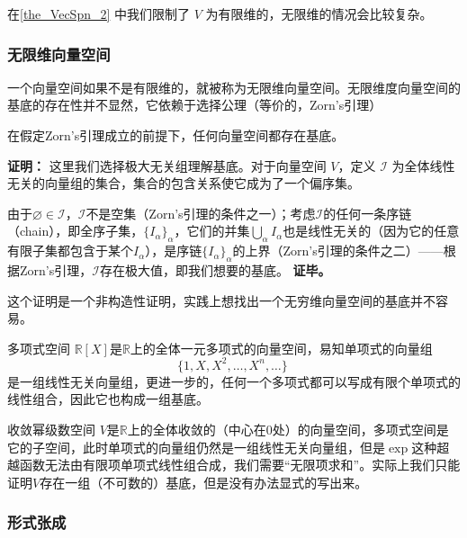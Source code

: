 在\autoref{the_VecSpn_2} 中我们限制了 $V$ 为有限维的，无限维的情况会比较复杂。

\subsubsection{无限维向量空间}

一个向量空间如果不是有限维的，就被称为无限维向量空间。无限维度向量空间的基底的存在性并不显然，它依赖于选择公理（等价的，Zorn's引理）

\begin{theorem}{}
在假定Zorn's引理成立的前提下，任何向量空间都存在基底。
\end{theorem}
\textbf{证明：}
这里我们选择极大无关组理解基底。对于向量空间 $V$，定义 $\mathcal{I}$ 为全体线性无关的向量组的集合，集合的包含关系使它成为了一个偏序集。


由于$\varnothing \in \mathcal{I}$，$\mathcal{I}$不是空集（Zorn's引理的条件之一）；考虑$\mathcal{I}$的任何一条序链（chain），即全序子集，$\{I_\alpha\}_\alpha$，它们的并集$\bigcup_\alpha I_\alpha$也是线性无关的（因为它的任意有限子集都包含于某个$I_\alpha$），是序链$\{I_\alpha\}_\alpha$的上界（Zorn's引理的条件之二）——根据Zorn's引理，$\mathcal{I}$存在极大值，即我们想要的基底。
\textbf{证毕。}

这个证明是一个非构造性证明，实践上想找出一个无穷维向量空间的基底并不容易。

\begin{example}{多项式空间}
$\mathbb{R}[X]$是$\mathbb{R}$上的全体一元多项式的向量空间，易知单项式的向量组
\begin{equation}
\{1, X, X^2, \dots, X^n, \dots\}~
\end{equation}
是一组线性无关向量组，更进一步的，任何一个多项式都可以写成有限个单项式的线性组合，因此它也构成一组基底。
\end{example}

\begin{example}{收敛幂级数空间}
$V$是$\mathbb{R}$上的全体收敛的（中心在$0$处）的向量空间，多项式空间是它的子空间，此时单项式的向量组仍然是一组线性无关向量组，但是$\exp$这种超越函数无法由有限项单项式线性组合成，我们需要“无限项求和”。实际上我们只能证明$V$存在一组（不可数的）基底，但是没有办法显式的写出来。
\end{example}

\subsubsection{形式张成}

